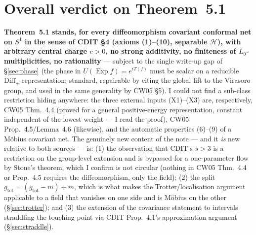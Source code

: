 \documentclass[11pt]{article}
\newcommand{\Hil}{\mathcal H}
\newcommand{\Diff}{\mathrm{Diff}_+}
\newcommand{\gtot}{g_{\mathrm{tot}}}
\newcommand{\Exp}{\operatorname{Exp}}
\begin{document}
\section{Overall verdict on Theorem~5.1}\label{sec:verdict}

\begin{verdictok}
\textbf{Theorem~5.1 stands, for every diffeomorphism covariant conformal net on $S^1$ in the sense of CDIT \S4
(axioms (1)--(10), separable $\Hil$), with arbitrary central charge $c>0$, no strong additivity, no finiteness
of $L_0$-multiplicities, no rationality} --- subject to the single write-up gap of \S\ref{sec:phase} (the phase
in $U(\Exp f)=e^{iT(f)}$ must be scalar on a reducible $\Diff$-representation; standard, repairable by citing
the global lift to the Virasoro group, and used in the same generality by CW05 \S5).  I could not find a
sub-class restriction hiding anywhere: the three external inputs (X1)--(X3) are, respectively, CW05 Thm.~4.4
(proved for a general positive-energy representation, constant independent of the lowest weight --- I read the
proof), CW05 Prop.~4.5/Lemma~4.6 (likewise), and the automatic properties (6)--(9) of a M\"obius covariant net.
The genuinely new content of the note --- and it \emph{is} new relative to both sources --- is:
(1) the observation that CDIT's $s>3$ is a restriction on the group-level extension and is bypassed for a
one-parameter flow by Stone's theorem, which I confirm is not circular (nothing in CW05 Thm.~4.4 or
Prop.~4.5 requires the diffeomorphism, only the field); (2) the split $\gtot=(\gtot-m)+m$, which is what makes
the Trotter/localisation argument applicable to a field that vanishes on one side and is M\"obius on the other
(\S\ref{sec:trotter}); and (3) the extension of the covariance statement to intervals straddling the touching
point via CDIT Prop.~4.1's approximation argument (\S\ref{sec:straddle}).
\end{verdictok}
\end{document}
